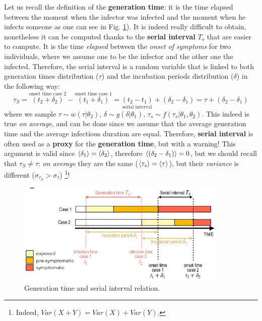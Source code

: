 \documentclass[../main/main.tex]{subfiles}
\begin{document}
Let us recall the definition of the \textbf{generation time}: it is the time elapsed between the moment when the infector was infected and the moment when he infects someone as one can see in Fig. \ref{fig:22_05}).
It is indeed really difficult to obtain, nonetheless it can be computed thanks to the \textbf{serial interval} $T_s$ that are easier to compute. It is the time \textit{elapsed} between the \textit{onset of symptoms} for two individuals, where we assume one to be the infector and the other one the infected. Therefore, the serial interval is a random variable that is linked to both generation times distribution ($\tau$) and the incubation periods distribution ($\delta$) in the following way:
\begin{equation}
    \tau_S = \overset{\text{onset time case 2}}{(t_2 + \delta_2)} - \overset{\text{onset time case 1}}{(t_1 + \delta_1)} = \underset{\text{serial interval}}{(t_2 - t_1)} + (\delta_2 - \delta_1) = \tau + (\delta_2 - \delta_1)
\end{equation}
where we sample $\tau \sim w(\tau|\theta_2)$, $\delta \sim g(\delta|\theta_1)$, $\tau_s \sim f(\tau_s|\theta_1,\theta_2)$.
This indeed is true \textit{on average}, and can be done since we assume that the average generation time and the average infectious duration are equal. Therefore, \textbf{serial interval} is often used as a \textbf{proxy} for the \textbf{generation time}, but with a warning! This argument is valid since $\expval{\delta_1} = \expval{\delta_2}$, therefore $\expval{(\delta_2 - \delta_1)} = 0$, but we should recall that $\tau_S \neq \tau$: \textit{on average} they are the same ($\expval{\tau_s} = \expval{\tau}$), but their \textit{variance} is different ($\sigma_{\tau_S}>\sigma_\tau$)
\footnote{Indeed, $Var(X+Y) = Var(X)+Var(Y)$.}!

\begin{figure}[h!]
\centering
\includegraphics[width=0.90\textwidth]{../lessons/image/22/image05.png}
\caption{\label{fig:22_05} Generation time and serial interval relation. }
\end{figure}
\end{document}
